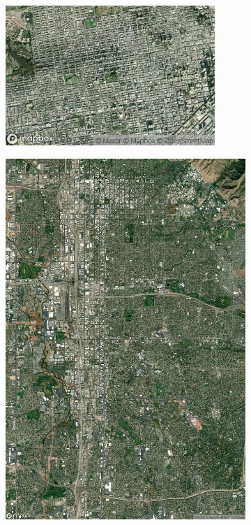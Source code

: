 \documentclass[
  letterpaper,
  DIV=11,
  numbers=noendperiod]{scrreprt}
\begin{document}
\begin{figure}

\begin{minipage}{0.33\linewidth}

\begin{figure}[H]

{\centering \includegraphics{images/san_francisco_scale_zoom_12.png}

}


\end{figure}%

\end{minipage}%
%
\begin{minipage}{0.33\linewidth}

\begin{figure}[H]

{\centering \includegraphics{images/salt_lake_city_zoom_12.png}

}
\end{figure}
\end{minipage}
\end{figure}
\end{document}
